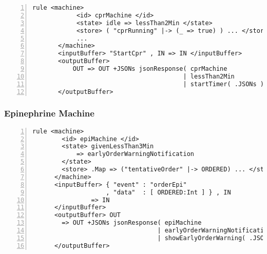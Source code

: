 \begin{lstlisting}[float=ht,
  frame=single,
  style=ksty,
  language=k,
  numbers=left,
  numbersep=5pt,
  caption={CPR Machine in \K{}},
  label={lst:cpr-machine-start},
  xleftmargin=3ex
]
  rule <machine>
            <id> cprMachine </id>
            <state> idle => lessThan2Min </state>                    @\label{lstline:idle-lessThan2Min}@
            <store> ( "cprRunning" |-> (_ => true) ) ... </store>    @\label{lstline:store-abstraction-dots}@
            ...                                                      @\label{lstline:machine-abstraction-dots}@
       </machine>
       <inputBuffer> "StartCpr" , IN => IN </inputBuffer>            @\label{lstline:read-inputBuffer}@
       <outputBuffer>                                                @\label{lstline:external-timer-start-begin}@
           OUT => OUT +JSONs jsonResponse( cprMachine
                                         | lessThan2Min
                                         | startTimer( .JSONs ) )
       </outputBuffer>                                               @\label{lstline:external-timer-start-end}@
\end{lstlisting}

\subsubsection{Epinephrine Machine}
\begin{lstlisting}[float=h,
  frame=single,
  style=ksty,
  language=k,
  numbers=left,
  numbersep=5pt,
  caption={Epi Machine in $\K$},
  label={lst:epi-machine-rule},
  xleftmargin=3ex
]
  rule <machine>
        <id> epiMachine </id>
        <state> givenLessThan3Min
            => earlyOrderWarningNotification
        </state>
        <store> .Map => ("tentativeOrder" |-> ORDERED) ... </store>
      </machine>
      <inputBuffer> { "event" : "orderEpi"                              @\label{lstline:input-buffer-json-read-begin}@
                    , "data"  : [ ORDERED:Int ] } , IN
                => IN
      </inputBuffer>                                                    @\label{lstline:input-buffer-json-read-end}@
      <outputBuffer> OUT                                                @\label{lstline:output-buffer-warning-begin}@
        => OUT +JSONs jsonResponse( epiMachine
                                  | earlyOrderWarningNotification
                                  | showEarlyOrderWarning( .JSONs ) )   @\label{lstline:output-buffer-warning-end}@
      </outputBuffer>
\end{lstlisting}


